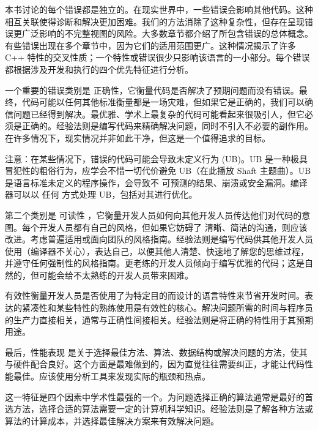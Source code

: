 
本书讨论的每个错误都是独立的。在现实世界中，一些错误会影响其他代码。这种相互关联使得诊断和解决更加困难。我们的方法消除了这种复杂性，但存在呈现错误更广泛影响的不完整视图的风险。大多数章节都介绍了所包含错误的总体概念。有些错误出现在多个章节中，因为它们的适用范围更广。这种情况揭示了许多 C++ 特性的交叉性质；一个特性或错误很少只影响该语言的一小部分。每个错误都根据涉及开发和执行的四个优先特征进行分析。


一个重要的错误类别是 正确性，它衡量代码是否解决了预期问题而没有错误。最终，代码可能以任何其他标准衡量都是一场灾难，但如果它是正确的，我们可以确信问题已经得到解决。最优雅、学术上最复杂的代码可能看起来很吸引人，但它必须是正确的。经验法则是编写代码来精确解决问题，同时不引入不必要的副作用。在许多情况下，现实情况并非如此干净，但这是一个值得追求的目标。

注意：在某些情况下，错误的代码可能会导致未定义行为 (UB)。UB 是一种极具冒犯性的粗俗行为，应学会不惜一切代价避免 UB（在此播放 Shaft 主题曲）。UB 是语言标准未定义的程序操作，会导致不 可预测的结果、崩溃或安全漏洞。编译器可以以 任何 方式处理 UB，包括对其进行优化。


第二个类别是 可读性 ，它衡量开发人员如何向其他开发人员传达他们对代码的意图。每个开发人员都有自己的风格，但如果它妨碍了 清晰、简洁的沟通，则应该改进。考虑普遍适用或面向团队的风格指南。经验法则是编写代码供其他开发人员使用（编译器不关心），表达自己，以便其他人清楚、快速地了解您的思维过程，并遵守任何强制性的风格指南。更老练的开发人员倾向于编写优雅的代码；这是自然的，但可能会给不太熟练的开发人员带来困难。


有效性衡量开发人员是否使用了为特定目的而设计的语言特性来节省开发时间。表达的紧凑性和某些特性的熟练使用是有效性的核心。解决问题所需的时间与程序员的生产力直接相关，通常与正确性间接相关。经验法则是将正确的特性用于其预期用途。


最后，性能表现 是关于选择最佳方法、算法、数据结构或解决问题的方法，使其与硬件配合良好。这个方面是最难做到的，因为直觉往往需要纠正，才能让代码性能最佳。应该使用分析工具来发现实际的瓶颈和热点。

这一特征是四个因素中学术性最强的一个。为问题选择正确的算法通常是最好的首选方法，选择合适的算法需要一定的计算机科学知识。经验法则是了解各种方法或算法的计算成本，并选择最佳解决方案来有效解决问题。
